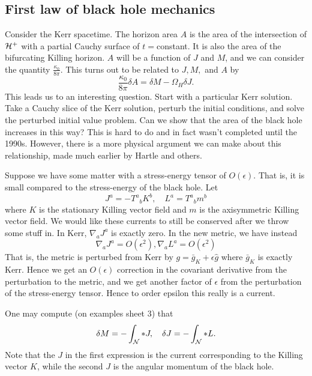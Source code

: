 \subsection*{First law of black hole mechanics}
Consider the Kerr spacetime. The horizon area $A$ is the area of the intersection of $\mathcal H^+$ with a partial Cauchy surface of $t={}$constant. It is also the area of the bifurcating Killing horizon. $A$ will be a function of $J$ and $M$, and we can consider the quantity $\frac{\kappa_0}{8\pi}$. This turns out to be related to $J,M,$ and $A$ by
\begin{equation}
    \frac{\kappa_0}{8\pi}\delta A = \delta M -\Omega_H \delta J.
\end{equation}
This leads us to an interesting question. Start with a particular Kerr solution. Take a Cauchy slice of the Kerr solution, perturb the initial conditions, and solve the perturbed initial value problem. Can we show that the area of the black hole increases in this way? This is hard to do and in fact wasn't completed until the 1990s.%
However, there is a more physical argument we can make about this relationship, made much earlier by Hartle and others.

Suppose we have some matter with a stress-energy tensor of $O(\epsilon)$. That is, it is small compared to the stress-energy of the black hole. Let
\begin{equation}
    J^a = -T^a{}_b K^b,\quad L^a = T^a{}_b m^b
\end{equation}
where $K$ is the stationary Killing vector field and $m$ is the axisymmetric Killing vector field. We would like these currents to still be conserved after we throw some stuff in. In Kerr, $\nabla_a J^a$ is exactly zero. In the new metric, we have instead
\begin{equation}
    \nabla_a J^a = O(\epsilon^2), \nabla_a L^a = O(\epsilon^2)
\end{equation}
That is, the metric is perturbed from Kerr by $g=\bar g_K +\epsilon \hat g$ where $\bar g_K$ is exactly Kerr. Hence we get an $O(\epsilon)$ correction in the covariant derivative from the perturbation to the metric, and we get another factor of $\epsilon$ from the perturbation of the stress-energy tensor. Hence to order epsilon this really is a current.

One may compute (on examples sheet 3) that
\begin{equation}
    \delta M =-\int_\mathcal N * J, \quad \delta J = -\int_\mathcal N * L.
\end{equation}
Note that the $J$ in the first expression is the current corresponding to the Killing vector $K$, while the second $J$ is the angular momentum of the black hole.

